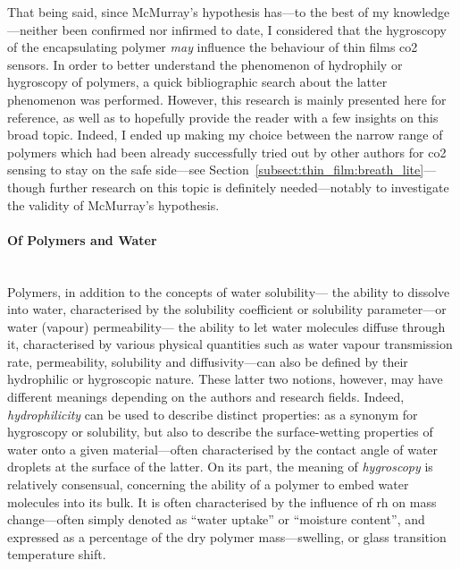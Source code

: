 That being said, since McMurray's hypothesis has---to the best of my knowledge---neither been confirmed nor infirmed to date, I considered that the hygroscopy of the encapsulating polymer \emph{may} influence the behaviour of thin films \gls{co2} sensors. In order to better understand the phenomenon of hydrophily or hygroscopy of polymers, a quick bibliographic search about the latter phenomenon was performed. However, this research is mainly presented here for reference, as well as to hopefully provide the reader with a few insights on this broad topic. Indeed, I ended up making my choice between the narrow range of polymers which had been already successfully tried out by other authors for \gls{co2} sensing to stay on the safe side---see Section~\ref{subsect:thin_film:breath_lite}---though \mfrin{}further research on this topic is definitely needed---notably to investigate the validity of McMurray's hypothesis.

\paragraph{Of Polymers and Water}\mbox{}\\

Polymers, in addition to the concepts of water solubility---\ie{} the ability to dissolve into water, characterised by the solubility coefficient or solubility parameter\cite{gong2007}---or water (vapour) permeability---\ie{} the ability to let water molecules diffuse through it, characterised by various physical quantities such as water vapour transmission rate, permeability, solubility and diffusivity\cite{chapter4_solubility}---can also be defined by their hydrophilic or hygroscopic nature. These latter two notions, however, may have different meanings depending on the authors and research fields. Indeed, \emph{hydrophilicity} can be used to describe distinct properties: as a synonym for hygroscopy or solubility, but also to describe the surface-wetting properties of water onto a given material---often characterised by the contact angle of water droplets at the surface of the latter\cite{drelich2011, corsaro2021}. On its part, the meaning of \emph{hygroscopy} is relatively consensual, concerning the ability of a polymer to embed water molecules into its bulk. It is often characterised by the influence of \gls{rh} on mass change---often simply denoted as \enquote{water uptake} or \enquote{moisture content}, and expressed as a percentage of the dry polymer mass\cite{valenzuela2011, vidovic2013}---swelling\cite{grossutti2020}, or glass transition temperature shift\cite{patel2022_part1, patel2022_part2, patel2023_part3}.

